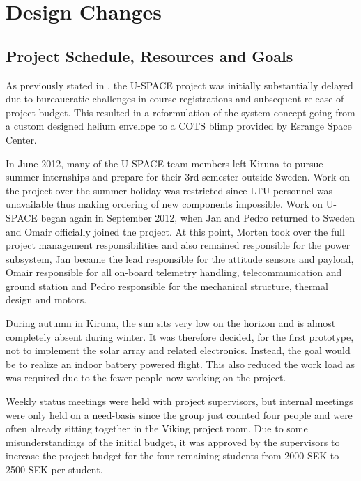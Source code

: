 \newpage
\chapter{Design Changes}
\label{chap:design_changes}
%
%
\section{Project Schedule, Resources and Goals}
\label{sec:project_changes}
%
As previously stated in \cite{CDR}, the U-SPACE project was initially substantially delayed due to bureaucratic challenges in course registrations and subsequent release of project budget. This resulted in a reformulation of the system concept going from a custom designed helium envelope to a \ac{COTS} blimp provided by Esrange Space Center.

In June 2012, many of the U-SPACE team members left Kiruna to pursue summer internships and prepare for their 3rd semester outside Sweden. Work on the project over the summer holiday was restricted since \ac{LTU} personnel was unavailable thus making ordering of new components impossible. Work on U-SPACE began again in September 2012, when Jan and Pedro returned to Sweden and Omair officially joined the project. At this point, Morten took over the full project management responsibilities and also remained responsible for the power subsystem, Jan became the lead responsible for the attitude sensors and payload, Omair responsible for all on-board telemetry handling, telecommunication and ground station and Pedro responsible for the mechanical structure, thermal design and motors.

During autumn in Kiruna, the sun sits very low on the horizon and is almost completely absent during winter. It was therefore decided, for the first prototype, not to implement the solar array and related electronics. Instead, the goal would be to realize an indoor battery powered flight. This also reduced the work load as was required due to the fewer people now working on the project.

Weekly status meetings were held with project supervisors, but internal meetings were only held on a need-basis since the group just counted four people and were often already sitting together in the Viking project room. 
Due to some misunderstandings of the initial budget, it was approved by the supervisors to increase the project budget for the four remaining students from 2000 SEK to 2500 SEK per student. 


